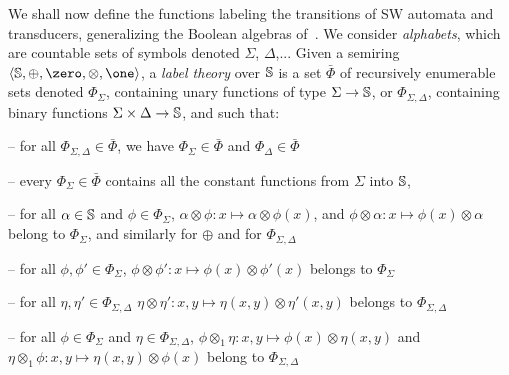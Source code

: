 %
%
We shall now define the functions labeling the transitions of SW automata and transducers,
generalizing the Boolean algebras of~\cite{dAntoniVeanes17CAV}.
%
We consider \emph{alphabets}, which are countable sets of symbols
denoted $\Sigma$, $\Delta$,...
%
\noindent
Given a semiring $\< \Semiring, \oplus, \zero, \otimes, \one>$,
a \emph{label theory} over $\mathbb{S}$
is a set $\bar\Phi$ of recursively enumerable sets denoted
$\Phi_\Sigma$, %
containing unary functions of type $\Sigma \to \mathbb{S}$, %
or $\Phi_{\Sigma, \Delta}$, containing binary functions $\Sigma \times \Delta \to \mathbb{S}$,
and such that:

\noindent --
for all $\Phi_{\Sigma, \Delta} \in \bar\Phi$, we have
$\Phi_{\Sigma} \in \bar\Phi$ and $\Phi_{\Delta} \in \bar\Phi$

\noindent --
every $\Phi_{\Sigma}\in \bar\Phi$ contains all the constant functions from $\Sigma$ into $\mathbb{S}$,

\noindent --
for all $\alpha \in \mathbb{S}$ and $\phi \in \Phi_\Sigma$,
      $\alpha \otimes \phi : x \mapsto \alpha \otimes \phi(x)$,
      and $\phi \otimes \alpha : x \mapsto \phi(x) \otimes \alpha$\\
\phantom{--} belong to $\Phi_\Sigma$, and similarly for $\oplus$
      and for $\Phi_{\Sigma, \Delta}$

\noindent --
for all $\phi, \phi' \in \Phi_\Sigma$,
$\phi \otimes \phi': x \mapsto \phi(x) \otimes \phi'(x)$ belongs to $\Phi_\Sigma$

\noindent --
for all $\eta, \eta' \in \Phi_{\Sigma, \Delta}$
$\eta \otimes \eta': x, y \mapsto \eta(x, y) \otimes \eta'(x, y)$ belongs to $\Phi_{\Sigma, \Delta}$

\noindent --
for all $\phi \in \Phi_\Sigma$ and $\eta \in \Phi_{\Sigma, \Delta}$,
$\phi \otimes_1 \eta: x, y \mapsto \phi(x) \otimes \eta(x, y)$ and\\
\phantom{--} $\eta \otimes_1 \phi: x, y \mapsto \eta(x, y) \otimes \phi(x)$
belong to $\Phi_{\Sigma, \Delta}$

